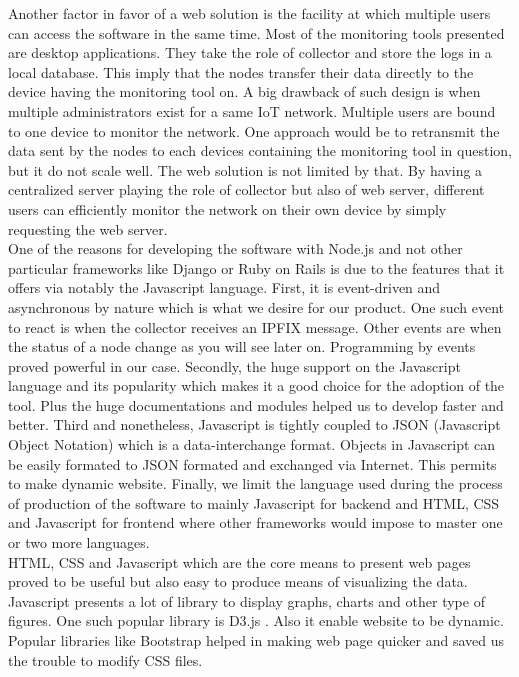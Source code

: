 Another factor in favor of a web solution is the facility at which multiple users can access the software in the same time. Most of the monitoring tools presented are desktop applications. They take the role of collector and store the logs in a local database. This imply that the nodes transfer their data directly to the device having the monitoring tool on. A big drawback of such design is when multiple administrators exist for a same IoT network. Multiple users are bound to one device to monitor the network. One approach would be to retransmit the data sent by the nodes to each devices containing the monitoring tool in question, but it do not scale well. The web solution is not limited by that. By having a centralized server playing the role of collector but also of web server, different users can efficiently monitor the network on their own device by simply requesting the web server. \\

One of the reasons for developing the software with Node.js and not other particular frameworks like Django or Ruby on Rails is due to the features that it offers via notably the Javascript language. First, it is event-driven and asynchronous by nature which is what we desire for our product. One such event to react is when the collector receives an IPFIX message. Other events are when the status of a node change as you will see later on. Programming by events proved powerful in our case. Secondly, the huge support on the Javascript language and its popularity which makes it a good choice for the adoption of the tool. Plus the huge documentations and modules helped us to develop faster and better. Third and nonetheless, Javascript is tightly coupled to JSON (Javascript Object Notation) \cite{website:json} which is a data-interchange format. Objects in Javascript can be easily formated to JSON formated and exchanged via Internet. This permits to make dynamic website. Finally, we limit the language used during the process of production of the software to mainly Javascript for backend and HTML, CSS and Javascript for frontend where other frameworks would impose to master one or two more languages.\\

HTML, CSS and Javascript which are the core means to present web pages proved to be useful but also easy to produce means of visualizing the data. Javascript presents a lot of library to display graphs, charts and other type of figures. One such popular library is D3.js \cite{website:d3}. Also it enable website to be dynamic. Popular libraries like Bootstrap helped in making web page quicker and saved us the trouble to modify CSS files.\\

